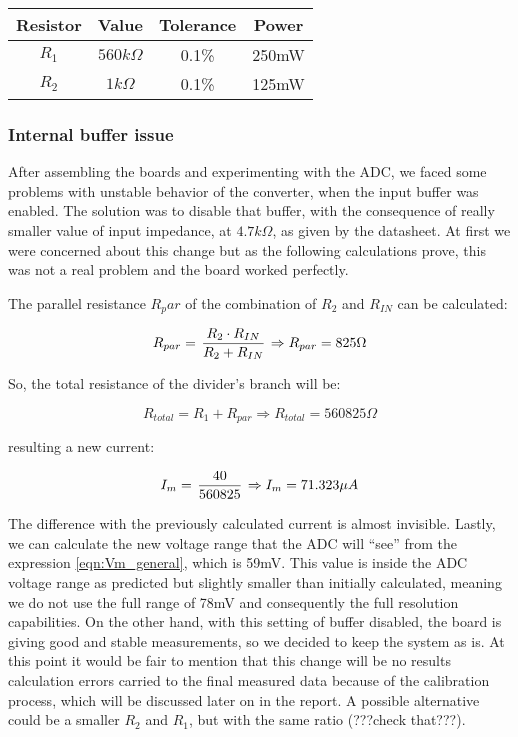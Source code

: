 \begin{center}
\begin{tabular}{ c c c c } 
 Resistor & Value & Tolerance & Power \\ \hline
 $R_1$ & $560k\Omega$ & 0.1\% & 250mW \\ 
 $R_2$ & $1k\Omega$ & 0.1\% & 125mW \\ 
\end{tabular}
\end{center}

\subsubsection{Internal buffer issue}
After assembling the boards and experimenting with the ADC, we faced some problems with unstable behavior of the converter, when the input buffer was enabled. The solution was to disable that buffer, with the consequence of really smaller value of input impedance, at $4.7k\Omega$, as given by the datasheet. At first we were concerned about this change but as the following calculations prove, this was not a real problem and the board worked perfectly.

The parallel resistance $R_par$ of the combination of $R_2$ and $R_{IN}$ can be calculated:

\begin{equation}
R_{par} = \left. R_2 \cdot R_{IN} \over R_2 + R_{IN} \right. \Rightarrow R_{par} = 825\Omega
\label{eqn:R_parallel}
\end{equation}

So, the total resistance of the divider's branch will be:

\begin{equation}
R_{total} = R_1 + R_{par} \Rightarrow R_{total} = 560825\Omega
\label{eqn:R_total}
\end{equation}

resulting a new current:

\begin{equation}
I_m = \left. 40 \over 560825 \right. \Rightarrow I_m = 71.323\mu A
\label{eqn:Im_new_calculation}
\end{equation}

The difference with the previously calculated current is almost invisible. Lastly, we can calculate
the new voltage range that the ADC will “see” from the expression \ref{eqn:Vm_general}, which is 59mV. This value is inside the ADC voltage range as predicted but slightly smaller than initially calculated, meaning we do not use the full range of 78mV and consequently the full resolution capabilities. On the other hand, with this setting of buffer disabled, the board is giving good and stable measurements, so we decided to keep the system as is. At this point it would be fair to mention that this change will be no results calculation errors carried to the final measured data because of the calibration process, which will be discussed later on in the report. A possible alternative could be a smaller $R_2$ and $R_1$, but with the same ratio (???check that???).

